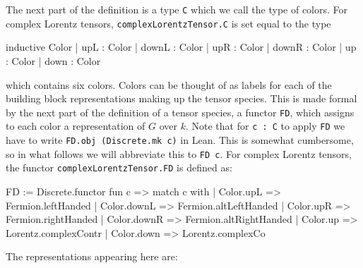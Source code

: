 \documentclass[a4paper, 11pt]{article}
\begin{document}
The next part of the definition is a type \lstinline|C| which we call the type of colors.
For complex Lorentz tensors, \lstinline|complexLorentzTensor.C| is set equal to the type
\begin{code}
inductive Color
  | upL : Color
  | downL : Color
  | upR : Color
  | downR : Color
  | up : Color
  | down : Color
\end{code}
which contains six colors.
Colors can be thought of as labels for each of the building 
block representations making up the tensor species.  This is made formal by the
next part of the definition of a tensor species, a functor 
\lstinline|FD|, which assigns to each color a representation of $G$ over $k$.
Note that for \lstinline|c : C| to apply \lstinline|FD| we have to write 
\lstinline|FD.obj (Discrete.mk c)| in Lean. This is somewhat cumbersome, so in what 
follows we will abbreviate this to \lstinline|FD c|.
For complex Lorentz tensors, the functor \lstinline|complexLorentzTensor.FD| is defined as:
\begin{code}
FD := Discrete.functor fun c =>
  match c with
  | Color.upL => Fermion.leftHanded
  | Color.downL => Fermion.altLeftHanded
  | Color.upR => Fermion.rightHanded
  | Color.downR => Fermion.altRightHanded
  | Color.up => Lorentz.complexContr
  | Color.down => Lorentz.complexCo
\end{code}
The representations appearing here are: 
\end{document}

